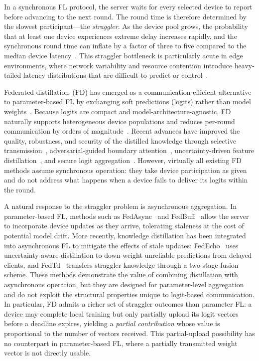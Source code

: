 \documentclass[a4paper,fleqn]{cas-dc}
\begin{document}
	In a synchronous FL protocol, the server waits for every selected
	device to report before advancing to the next round.  The round time
	is therefore determined by the slowest participant---the
	\emph{straggler}.  As the device pool grows, the probability that at
	least one device experiences extreme delay increases rapidly, and the
	synchronous round time can inflate by a factor of three to five
	compared to the median device
	latency~\citep{nguyen_fedbuff_2022}.  This straggler bottleneck is
	particularly acute in edge environments, where network
	variability and resource contention introduce heavy-tailed latency
	distributions that are difficult to predict or
	control~\citep{mora_kdfl_guide_2024}.
	
	Federated distillation~(FD) has emerged as a communication-efficient
	alternative to parameter-based FL by exchanging soft predictions
	(logits) rather than model
	weights~\citep{li_fedmd_2019, lin_feddf_2020}.  Because logits are
	compact and model-architecture-agnostic, FD naturally supports
	heterogeneous device populations and reduces per-round communication
	by orders of magnitude~\citep{hinton_kd_2015}.  Recent advances have
	improved the quality, robustness, and security of the distilled
	knowledge through selective transmission~\citep{gad_fedskd_2024},
	adversarial-guided boundary
	attention~\citep{wu_feddfa_2024}, uncertainty-driven feature
	distillation~\citep{shao_fedufd_2025}, and secure logit
	aggregation~\citep{chen_svafd_2025}.  However, virtually all existing
	FD methods assume synchronous operation: they take device
	participation as given and do not address what happens when a device
	fails to deliver its logits within the round.
	
	A natural response to the straggler problem is asynchronous
	aggregation.  In parameter-based FL, methods such as
	FedAsync~\citep{xie_async_fedopt_2019} and
	FedBuff~\citep{nguyen_fedbuff_2022} allow the server to incorporate
	device updates as they arrive, tolerating staleness at the cost of
	potential model drift.  More recently, knowledge distillation has been
	integrated into asynchronous FL to mitigate the effects of stale
	updates: FedEcho~\citep{wang_fedecho_2025} uses uncertainty-aware
	distillation to down-weight unreliable predictions from delayed
	clients, and FedTd~\citep{xu_fedtd_2025} transfers straggler
	knowledge through a two-stage fusion scheme.  These methods
	demonstrate the value of combining distillation with asynchronous
	operation, but they are designed for parameter-level aggregation and
	do not exploit the structural properties unique to logit-based
	communication.  In particular, FD admits a richer set of straggler
	outcomes than parameter FL: a device may complete local training but
	only partially upload its logit vectors before a deadline expires,
	yielding a \emph{partial contribution} whose value is proportional to
	the number of vectors received.  This partial-upload possibility has
	no counterpart in parameter-based FL, where a partially transmitted
	weight vector is not directly usable.
	
\end{document}

